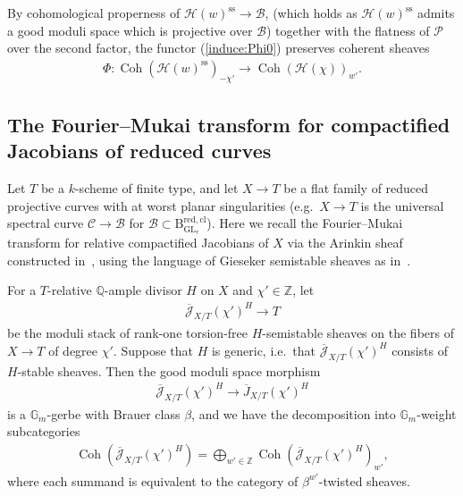 \documentclass[11pt,oneside,a4paper,mathscr]{amsart}
\theoremstyle{definition}
\newcommand{\cH}{\mathcal{H}}
\newcommand{\cB}{\mathcal{B}}
\newcommand{\cC}{\mathcal{C}}
\newcommand{\cP}{\mathcal{P}}
\newcommand{\rB}{\mathrm{B}}
\newcommand{\Coh}{\operatorname{Coh}}
\newcommand{\GL}{\operatorname{GL}}
\begin{document}
By cohomological properness of $\cH(w)^{\mathrm{ss}}\to \cB$,
(which holds as $\cH(w)^{\mathrm{ss}}$ admits a good moduli space which is projective over $\cB$)
together with the flatness of $\cP$ over the second factor, the functor (\ref{induce:Phi0}) preserves coherent sheaves
\begin{align}\label{induce:Phi}
    \Phi \colon   \Coh(\cH(w)^{\mathrm{ss}})_{-\chi'} \to \Coh(\cH(\chi))_{w'}. 
\end{align}





\subsection{The Fourier--Mukai transform for compactified Jacobians of reduced curves}\label{subsec:FMJ}

Let $T$ be a $k$-scheme of finite type, and let $X\to T$ be a flat family of reduced projective curves with at worst planar singularities 
(e.g.\ $X\to T$ is the universal spectral curve $\cC\to \cB$ for $\cB \subset \rB_{\GL_r}^{\mathrm{red,cl}}$).
Here we recall the Fourier--Mukai transform for relative compactified Jacobians of $X$ 
via the Arinkin sheaf constructed in~\cite{MRVF2}, using the language of Gieseker semistable sheaves as in~\cite[Subsection~2.10]{TodaGL2}.

For a $T$-relative $\mathbb{Q}$-ample divisor $H$ on $X$ and $\chi' \in \mathbb{Z}$, let 
\begin{align}\label{map:T}
\overline{\mathcal{J}}_{X/T}(\chi')^H \to T
\end{align}
be the moduli stack of rank-one torsion-free $H$-semistable sheaves on the fibers of $X\to T$ of degree $\chi'$. 
Suppose that $H$ is generic, i.e.\ that $\overline{\mathcal{J}}_{X/T}(\chi')^H$
consists of $H$-stable sheaves. 
Then the good moduli space morphism
\begin{align*}
    \overline{\mathcal{J}}_{X/T}(\chi')^H \to \overline{J}_{X/T}(\chi')^H
\end{align*}
is a $\mathbb{G}_m$-gerbe with Brauer class $\beta$, and we have the decomposition into $\mathbb{G}_m$-weight subcategories
\begin{align*}
    \Coh(\overline{\mathcal{J}}_{X/T}(\chi')^H)
    =
    \bigoplus_{w'\in \mathbb{Z}}
    \Coh(\overline{\mathcal{J}}_{X/T}(\chi')^H)_{w'},
\end{align*}
where each summand is equivalent to the category of $\beta^{w'}$-twisted sheaves.
\end{document}
